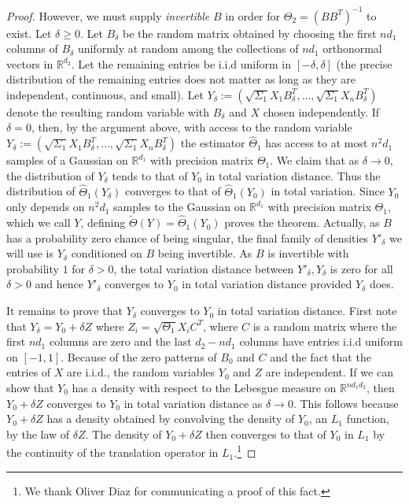 \documentclass[aos]{imsart}
\theoremstyle{definition}
\numberwithin{equation}{section}
\newcommand{\R}{{\mathbb{R}}}
\begin{document}
\begin{proof}
However, we must supply \emph{invertible} $B$ in order for $\Theta_2 = (BB^T)^{-1}$ to exist.
Let $\delta \geq 0$.
Let $B_\delta$ be the random matrix obtained by choosing the first $nd_1$ columns of $B_\delta$ uniformly at random among the collections of $nd_1$ orthonormal vectors in $\R^{d_2}$.
Let the remaining entries be i.i.d uniform in $[-\delta, \delta]$ (the precise distribution of the remaining entries does not matter as long as they are independent, continuous, and small).
Let $Y_\delta:=(\sqrt{\Sigma_1} X_1 B_\delta^T, \dots, \sqrt{\Sigma_1} X_n B_\delta^T)$ denote the resulting random variable with $B_\delta$ and $X$ chosen independently.
If $\delta = 0$, then, by the argument above, with access to the random variable $Y_\delta:=(\sqrt{\Sigma_1} X_1 B_\delta^T, \dots, \sqrt{\Sigma_1} X_n B_\delta^T)$ the estimator $\widehat{\Theta}_1$ has access to at most $n^2d_1$ samples of a Gaussian on $\R^{d_1}$ with precision matrix $\Theta_1$.
We claim that as $\delta \to 0$, the distribution of $Y_\delta$ tends to that of $Y_0$ in total variation distance.
Thus the distribution of $\widehat{\Theta}_1(Y_\delta)$ converges to that of $\widehat{\Theta}_1(Y_0)$ in total variation.
Since $Y_0$ only depends on $n^2d_1$ samples to the Gaussian on $\R^{d_1}$ with precision matrix $\Theta_1$, which we call $Y$, defining $\tilde{\Theta}(Y) = \widehat{\Theta}_1(Y_0)$ proves the theorem.
Actually, as $B$ has a probability zero chance of being singular, the final family of densities $Y'_\delta$ we will use is $Y_\delta$ conditioned on $B$ being invertible.
As $B$ is invertible with probability $1$ for $\delta > 0$, the total variation distance between $Y'_\delta, Y_\delta$ is zero for all $\delta > 0$ and hence $Y'_\delta$ converges to $Y_0$ in total variation distance provided $Y_\delta$ does.

It remains to prove that $Y_\delta$ converges to $Y_0$ in total variation distance.
First note that $Y_\delta = Y_0 + \delta Z$ where $Z_i = \sqrt{\Theta_1} X_i C^T$, where $C$ is a random matrix where the first $nd_1$ columns are zero and the last $d_2 - n d_1$ columns have entries i.i.d uniform on $[-1, 1]$.
Because of the zero patterns of $B_0$ and $C$ and the fact that the entries of $X$ are i.i.d., the random variables $Y_0$ and $Z$ are independent.
If we can show that $Y_0$ has a density with respect to the Lebesgue measure on $\R^{nd_1d_2}$, then $Y_0 + \delta Z$ converges to $Y_0$ in total variation distance as $\delta \to 0$.
This follows because $Y_0 + \delta Z$ has a density obtained by convolving the density of $Y_0$, an $L_1$ function, by the law of $\delta Z$.
The density of $Y_0 + \delta Z$ then converges to that of $Y_0$ in $L_1$ by the continuity of the translation operator in $L_1$.\footnote{We thank Oliver Diaz for communicating a proof of this fact.}


\end{proof}
\end{document}
